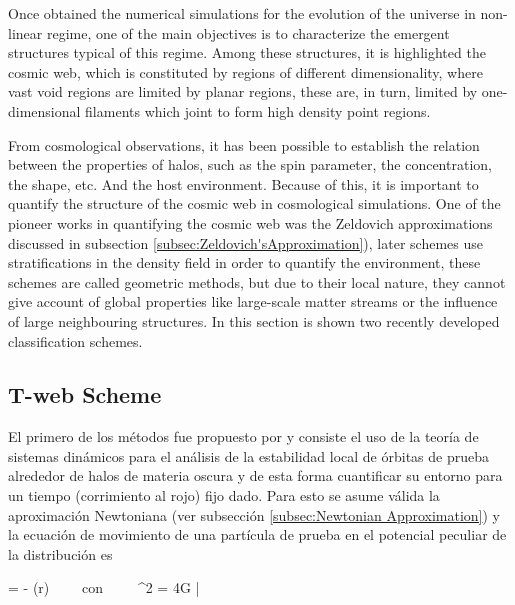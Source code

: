 Once obtained the numerical simulations for the evolution of the universe 
in non-linear regime, one of the main objectives is to characterize the 
emergent structures typical of this regime. Among these structures, it is
highlighted the cosmic web, which is constituted by regions of different 
dimensionality, where vast void regions are limited by planar regions, 
these are, in turn, limited by one-dimensional filaments which joint to 
form high density point regions.


From cosmological observations, it has been possible to establish the 
relation between the properties of halos, such as the spin parameter, the
concentration, the shape, etc. And the host environment. Because of this,
it is important to quantify the structure of the cosmic web in cosmological
simulations. One of the pioneer works in quantifying the cosmic web was 
the Zeldovich approximations discussed in subsection 
\ref{subsec:Zeldovich'sApproximation}), later schemes use stratifications
in the density field in order to quantify the environment, these schemes
are called geometric methods, but due to their local nature, they cannot
give account of global properties like large-scale matter streams or the
influence of large neighbouring structures. In this section is shown two
recently developed classification schemes.



	\subsection{T-web Scheme}
	\label{subsec:TheT-webMethod}


El primero de los métodos fue propuesto por \cite{Hahn2007} y consiste el
uso de la teoría de sistemas dinámicos para el análisis de la estabilidad 
local de órbitas de prueba alrededor de halos de materia oscura y de esta 
forma cuantificar su entorno para un tiempo (corrimiento al rojo) fijo 
dado. Para esto se asume válida la aproximación Newtoniana (ver subsección 
\ref{subsec:Newtonian Approximation}) y la ecuación de movimiento de una 
partícula de prueba en el potencial peculiar de la distribución es


{  = - \nabla \phi(\bds r) \ \ \ \ 
\mbox{con}\ \ \ \ \ \nabla^2 \phi = 4\pi G \bar \rho \delta}


